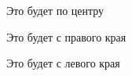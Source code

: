 \documentclass[a4paper, 12pt]{article}
\begin{document}
    \begin{center} %
        Это будет по центру
    \end{center}

    \begin{flushright}
        Это будет с правого края
    \end{flushright}

    \begin{flushleft}
        Это будет с левого края
    \end{flushleft}
\end{document}
